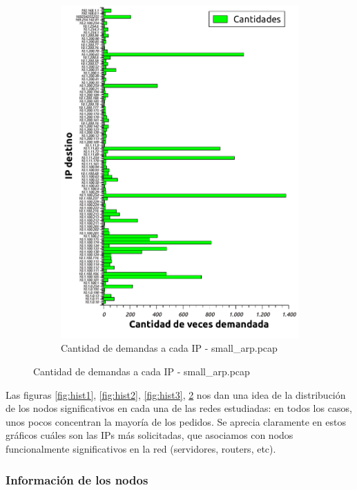 \begin{figure}[H]
\begin{subfigure}[H]{0.5\textwidth}
                \includegraphics[width=1\textwidth]{graficos/cantidadConsultasSmall.pdf}
                \caption{Cantidad de demandas a cada IP - small\_arp.pcap}
                \label{fig:hist4}
        \end{subfigure}
\end{figure}

Las figuras \ref{fig:hist1}, \ref{fig:hist2}, \ref{fig:hist3}, \ref{fig:hist4} nos dan una idea de la distribuci\'on de los nodos significativos en cada una de las redes estudiadas: en todos los casos, unos pocos concentran la mayor\'ia de los pedidos. Se aprecia claramente en estos gr\'aficos cuáles son las IPs más solicitadas, que asociamos con nodos funcionalmente significativos en la red (servidores, routers, etc).

\subsubsection{Informaci\'on de los nodos}

